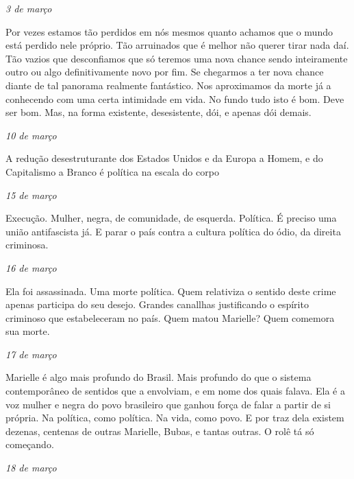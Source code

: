 \begin{flushright}
\emph{3 de março}
\end{flushright}

Por vezes estamos tão perdidos em nós mesmos quanto achamos que o mundo
está perdido nele próprio. Tão arruinados que é melhor não querer tirar
nada daí. Tão vazios que desconfiamos que só teremos uma nova chance
sendo inteiramente outro ou algo definitivamente novo por fim. Se
chegarmos a ter nova chance diante de tal panorama realmente fantástico.
Nos aproximamos da morte já a conhecendo com uma certa intimidade em
vida. No fundo tudo isto é bom. Deve ser bom. Mas, na forma existente,
desesistente, dói, e apenas dói demais.

\begin{flushright}
\emph{10 de março}
\end{flushright}

A redução desestruturante dos Estados Unidos e da Europa a Homem, e do
Capitalismo a Branco é política na escala do corpo

\begin{flushright}
\emph{15 de março}
\end{flushright}

Execução. Mulher, negra, de comunidade, de esquerda. Política. É preciso
uma união antifascista já. E parar o país contra a cultura política do
ódio, da direita criminosa.

\begin{flushright}
\emph{16 de março}
\end{flushright}

Ela foi assassinada. Uma morte política. Quem relativiza o sentido deste
crime apenas participa do seu desejo. Grandes canallhas justificando o
espírito criminoso que estabeleceram no país. Quem matou Marielle? Quem
comemora sua morte.

\begin{flushright}
\emph{17 de março}
\end{flushright}

Marielle é algo mais profundo do Brasil. Mais profundo do que o sistema
contemporâneo de sentidos que a envolviam, e em nome dos quais falava.
Ela é a voz mulher e negra do povo brasileiro que ganhou força de falar
a partir de si própria. Na política, como política. Na vida, como povo.
E por traz dela existem dezenas, centenas de outras Marielle, Bubas, e
tantas outras. O rolê tá só começando.

\begin{flushright}
\emph{18 de março}
\end{flushright}

